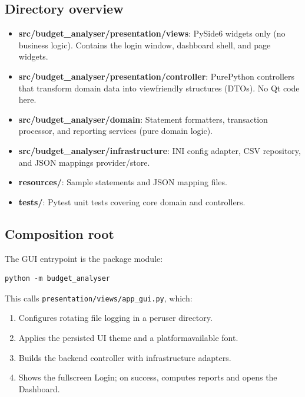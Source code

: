 \documentclass[11pt,a4paper]{report}
\begin{document}
\subsection*{Directory overview}
\begin{itemize}[leftmargin=*]
  \item \textbf{src/budget\_analyser/presentation/views}: PySide6 widgets only (no business logic). Contains the login window, dashboard shell, and page widgets.
  \item \textbf{src/budget\_analyser/presentation/controller}: Pure\-Python controllers that transform domain data into view\-friendly structures (DTOs). No Qt code here.
  \item \textbf{src/budget\_analyser/domain}: Statement formatters, transaction processor, and reporting services (pure domain logic).
  \item \textbf{src/budget\_analyser/infrastructure}: INI config adapter, CSV repository, and JSON mappings provider/store.
  \item \textbf{resources/}: Sample statements and JSON mapping files.
  \item \textbf{tests/}: Pytest unit tests covering core domain and controllers.
\end{itemize}

\subsection*{Composition root}
The GUI entrypoint is the package module:
\begin{verbatim}
python -m budget_analyser
\end{verbatim}
This calls \texttt{presentation/views/app\_gui.py}, which:
\begin{enumerate}[leftmargin=*]
  \item Configures rotating file logging in a per\-user directory.
  \item Applies the persisted UI theme and a platform\-available font.
  \item Builds the backend controller with infrastructure adapters.
  \item Shows the fullscreen Login; on success, computes reports and opens the Dashboard.
\end{enumerate}
\end{document}
